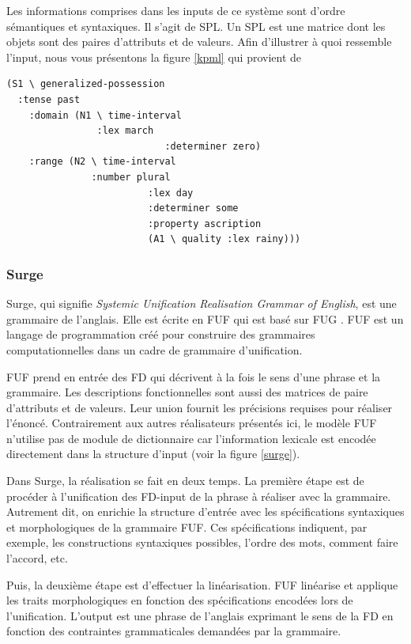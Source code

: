 Les informations comprises dans les inputs de ce système sont d'ordre sémantiques et syntaxiques. Il s'agit de \acf{SPL}. Un \ac{SPL} est une matrice dont les objets sont des paires d'attributs et de valeurs. Afin d'illustrer à quoi ressemble l'input, nous vous présentons la figure \ref{kpml} qui provient de \cite{ReiterBuildingNaturalLanguage2000} 

\begin{lstlisting}[language=Xml, caption=SPL: input de KPML, label=kpml]
(S1 \ generalized-possession
  :tense past 
	:domain (N1 \ time-interval
	            :lex march
							:determiner zero)
	:range (N2 \ time-interval
	           :number plural
						 :lex day
						 :determiner some
						 :property ascription
						 (A1 \ quality :lex rainy)))
\end{lstlisting}

\subsubsection{Surge}
Surge, qui signifie \emph{Systemic Unification Realisation Grammar of English}, est une grammaire de l'anglais\citep{Elhadad98surge:a}. Elle est écrite en \acf{FUF} qui est basé sur \acf{FUG} \citep{KayFunctionalUnificationGrammar1984}. \ac{FUF} est un langage de programmation créé pour construire des grammaires computationnelles dans un cadre de grammaire d'unification.

\ac{FUF} prend en entrée des \acf{FD} qui décrivent à la fois le sens d'une phrase et la grammaire. Les descriptions fonctionnelles sont aussi des matrices de paire d'attributs et de valeurs. Leur union fournit les précisions requises pour réaliser l'énoncé. Contrairement aux autres réalisateurs présentés ici, le modèle \ac{FUF} n'utilise pas de module de dictionnaire car l'information lexicale est encodée directement dans la structure d'input (voir la figure \ref{surge}).

Dans Surge, la réalisation se fait en deux temps. La première étape est de procéder à l'unification des \ac{FD}-input de la phrase à réaliser avec la grammaire. Autrement dit, on enrichie la structure d’entrée avec les spécifications syntaxiques et morphologiques de la grammaire \ac{FUF}. Ces spécifications indiquent, par exemple, les constructions syntaxiques possibles, l'ordre des mots, comment faire l'accord, etc.

Puis, la deuxième étape est d'effectuer la linéarisation. \ac{FUF} linéarise et applique les traits morphologiques en fonction des spécifications encodées lors de l'unification. L'output est une phrase de l'anglais exprimant le sens de la \ac{FD} en fonction des contraintes grammaticales demandées par la grammaire.


